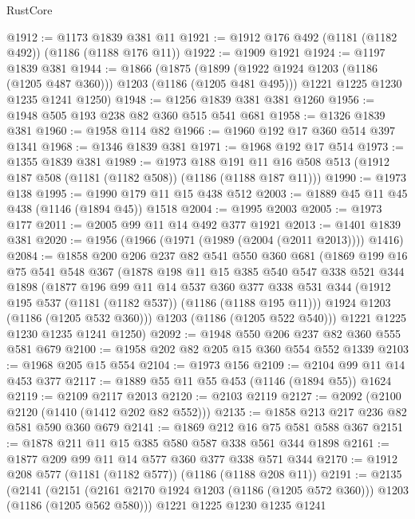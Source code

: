 \begin{lexlean}{RustCore}
\begin{coremodule}
@1912 := @1173 @1839 @381 @11
@1921 := @1912 @176 @492 (@1181 (@1182 @492)) (@1186 (@1188 @176 @11))
@1922 := @1909 @1921
@1924 := @1197 @1839 @381
@1944 := @1866
    (@1875
      (@1899 (@1922 @1924 @1203 (@1186 (@1205 @487 @360))) @1203 (@1186 (@1205 @481 @495)))
      @1221
      @1225
      @1230
      @1235
      @1241
      @1250)
@1948 := @1256 @1839 @381 @381 @1260
@1956 := @1948 @505 @193 @238 @82 @360 @515 @541 @681
@1958 := @1326 @1839 @381
@1960 := @1958 @114 @82
@1966 := @1960 @192 @17 @360 @514 @397 @1341
@1968 := @1346 @1839 @381
@1971 := @1968 @192 @17 @514
@1973 := @1355 @1839 @381
@1989 := @1973
    @188
    @191
    @11
    @16
    @508
    @513
    (@1912 @187 @508 (@1181 (@1182 @508)) (@1186 (@1188 @187 @11)))
@1990 := @1973 @138
@1995 := @1990 @179 @11 @15 @438 @512
@2003 := @1889 @45 @11 @45 @438 (@1146 (@1894 @45)) @1518
@2004 := @1995 @2003
@2005 := @1973 @177
@2011 := @2005 @99 @11 @14 @492 @377 @1921
@2013 := @1401 @1839 @381
@2020 := @1956 (@1966 (@1971 (@1989 (@2004 (@2011 @2013)))) @1416)
@2084 := @1858
    @200
    @206
    @237
    @82
    @541
    @550
    @360
    @681
    (@1869
      @199
      @16
      @75
      @541
      @548
      @367
      (@1878
        @198
        @11
        @15
        @385
        @540
        @547
        @338
        @521
        @344
        @1898
        (@1877
          @196
          @99
          @11
          @14
          @537
          @360
          @377
          @338
          @531
          @344
          (@1912 @195 @537 (@1181 (@1182 @537)) (@1186 (@1188 @195 @11)))
          @1924
          @1203
          (@1186 (@1205 @532 @360)))
        @1203
        (@1186 (@1205 @522 @540)))
      @1221
      @1225
      @1230
      @1235
      @1241
      @1250)
@2092 := @1948 @550 @206 @237 @82 @360 @555 @581 @679
@2100 := @1958 @202 @82 @205 @15 @360 @554 @552 @1339
@2103 := @1968 @205 @15 @554
@2104 := @1973 @156
@2109 := @2104 @99 @11 @14 @453 @377
@2117 := @1889 @55 @11 @55 @453 (@1146 (@1894 @55)) @1624
@2119 := @2109 @2117 @2013
@2120 := @2103 @2119
@2127 := @2092 (@2100 @2120 (@1410 (@1412 @202 @82 @552)))
@2135 := @1858 @213 @217 @236 @82 @581 @590 @360 @679
@2141 := @1869 @212 @16 @75 @581 @588 @367
@2151 := @1878 @211 @11 @15 @385 @580 @587 @338 @561 @344 @1898
@2161 := @1877 @209 @99 @11 @14 @577 @360 @377 @338 @571 @344
@2170 := @1912 @208 @577 (@1181 (@1182 @577)) (@1186 (@1188 @208 @11))
@2191 := @2135
    (@2141
      (@2151 (@2161 @2170 @1924 @1203 (@1186 (@1205 @572 @360))) @1203 (@1186 (@1205 @562 @580)))
      @1221
      @1225
      @1230
      @1235
      @1241

\end{coremodule}
\end{lexlean}
